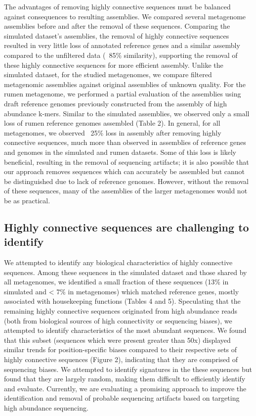 \documentclass[10pt]{article}
\begin{document}
The advantages of removing highly connective sequences must be balanced against consequences to resulting assemblies.  We compared several metagenome assemblies before and after the removal of these sequences.   Comparing the simulated dataset's assemblies, the removal of highly connective sequences resulted in very little loss of annotated reference genes and a similar assembly compared to the unfiltered data (~85\% similarity), supporting the removal of these highly connective sequences for more efficient assembly.  Unlike the simulated dataset, for the studied metagenomes, we compare filtered metagenomic assemblies against original assemblies of unknown quality.  For the rumen metagenome, we performed a partial evaluation of the assemblies using draft reference genomes previously constructed from the assembly of high abundance k-mers.   Similar to the simulated assemblies, we observed only a small loss of rumen reference genomes assembled (Table 2).  In general, for all metagenomes, we observed ~25\% loss in assembly after removing highly connective sequences, much more than observed in assemblies of reference genes and genomes in the simulated and rumen datasets.  Some of this loss is likely beneficial, resulting in the removal of sequencing artifacts; it is also possible that our approach removes sequences which can accurately be assembled but cannot be distinguished due to lack of reference genomes.  However, without the removal of these sequences, many of the assemblies of the larger metagenomes would not be as practical.  

\subsection*{Highly connective sequences are challenging to identify}

We attempted to identify any biological characteristics of highly connective sequences.  Among these sequences in the simulated dataset and those shared by all metagenomes, we identified a small fraction of these sequences (13\% in simulated and < 7\% in metagenomes) which matched reference genes, mostly associated with housekeeping functions (Tables 4 and 5).  Speculating that the remaining highly connective sequences originated from high abundance reads (both from biological sources of high connectivity or sequencing biases), we attempted to identify characteristics of the most abundant sequences.  We found that this subset (sequences which were present greater than 50x) displayed similar trends for position-specific biases compared to their respective sets of highly connective sequences (Figure 2), indicating that they are comprised of sequencing biases.  We attempted to identify signatures in the these sequences but found that they are largely random, making them difficult to efficiently identify and evaluate.  Currently, we are evaluating a promising approach to improve the identification and removal of probable sequencing artifacts based on targeting high abundance sequencing. 
\end{document}
